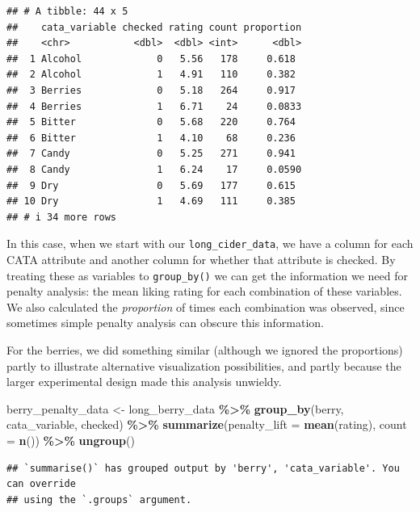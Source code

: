 \documentclass[
]{book}
\newenvironment{Shaded}{\begin{snugshade}}{\end{snugshade}}
\newcommand{\AttributeTok}[1]{\textcolor[rgb]{0.13,0.29,0.53}{#1}}
\newcommand{\FunctionTok}[1]{\textcolor[rgb]{0.13,0.29,0.53}{\textbf{#1}}}
\newcommand{\NormalTok}[1]{#1}
\newcommand{\OtherTok}[1]{\textcolor[rgb]{0.56,0.35,0.01}{#1}}
\newcommand{\SpecialCharTok}[1]{\textcolor[rgb]{0.81,0.36,0.00}{\textbf{#1}}}
\begin{document}
\begin{verbatim}
## # A tibble: 44 x 5
##    cata_variable checked rating count proportion
##    <chr>           <dbl>  <dbl> <int>      <dbl>
##  1 Alcohol             0   5.56   178     0.618 
##  2 Alcohol             1   4.91   110     0.382 
##  3 Berries             0   5.18   264     0.917 
##  4 Berries             1   6.71    24     0.0833
##  5 Bitter              0   5.68   220     0.764 
##  6 Bitter              1   4.10    68     0.236 
##  7 Candy               0   5.25   271     0.941 
##  8 Candy               1   6.24    17     0.0590
##  9 Dry                 0   5.69   177     0.615 
## 10 Dry                 1   4.69   111     0.385 
## # i 34 more rows
\end{verbatim}

In this case, when we start with our \texttt{long\_cider\_data}, we have a column for each CATA attribute and another column for whether that attribute is checked. By treating these as variables to \texttt{group\_by()} we can get the information we need for penalty analysis: the mean liking rating for each combination of these variables. We also calculated the \emph{proportion} of times each combination was observed, since sometimes simple penalty analysis can obscure this information.

For the berries, we did something similar (although we ignored the proportions) partly to illustrate alternative visualization possibilities, and partly because the larger experimental design made this analysis unwieldy.

\begin{Shaded}
\begin{Highlighting}[]
\NormalTok{berry\_penalty\_data }\OtherTok{\textless{}{-}} 
\NormalTok{  long\_berry\_data }\SpecialCharTok{\%\textgreater{}\%}
  \FunctionTok{group\_by}\NormalTok{(berry, cata\_variable, checked) }\SpecialCharTok{\%\textgreater{}\%}
  \FunctionTok{summarize}\NormalTok{(}\AttributeTok{penalty\_lift =} \FunctionTok{mean}\NormalTok{(rating),}
            \AttributeTok{count =} \FunctionTok{n}\NormalTok{()) }\SpecialCharTok{\%\textgreater{}\%}
  \FunctionTok{ungroup}\NormalTok{() }
\end{Highlighting}
\end{Shaded}

\begin{verbatim}
## `summarise()` has grouped output by 'berry', 'cata_variable'. You can override
## using the `.groups` argument.
\end{verbatim}
\end{document}
